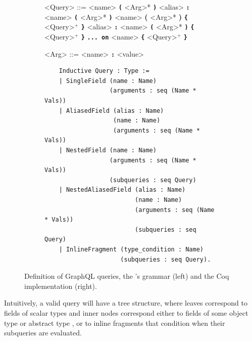 \begin{figure}[h]
  \centering
  \begin{subfigure}{.5\textwidth}
    \begin{grammar}
        <Query> ::= <name> \textbf{\texttt{(}} <Arg>* \textbf{\texttt{)}}
        \alt <alias> \textbf{\texttt{:}} <name> \textbf{\texttt{(}} <Arg>* \textbf{\texttt{)}}
        \alt <name> \textbf{(} <Arg>* \textbf{)} \textbf{\texttt{\{}} <Query>$^{+}$ \textbf{\texttt{\}}}
        \alt <alias> \textbf{\texttt{:}} <name> \textbf{\texttt{(}} <Arg>* \textbf{\texttt{)}} \textbf{\texttt{\{}} <Query>$^{+}$ \textbf{\texttt{\}}}
        \alt \textbf{\texttt{... on}} <name> \textbf{\texttt{\{}} <Query>$^{+}$ \textbf{\texttt{\}}}
        
        <Arg> ::= <name> \textbf{\texttt{:}} <value>
    \end{grammar}
  \end{subfigure}%
  \begin{subfigure}{.5\textwidth}

    \begin{verbatim}
    Inductive Query : Type :=
    | SingleField (name : Name)
                  (arguments : seq (Name * Vals))
    | AliasedField (alias : Name)
                   (name : Name)
                   (arguments : seq (Name * Vals))
    | NestedField (name : Name)
                  (arguments : seq (Name * Vals))
                  (subqueries : seq Query)
    | NestedAliasedField (alias : Name)
                         (name : Name)
                         (arguments : seq (Name * Vals))
                         (subqueries : seq Query)
    | InlineFragment (type_condition : Name)
                     (subqueries : seq Query).
    \end{verbatim}
  \end{subfigure}
  \caption{Definition of GraphQL queries, the \spec{}'s grammar (left) and the Coq implementation (right).}
  \label{fig:query_def}
\end{figure}

Intuitively, a valid query will have a tree structure, where leaves correspond to fields of scalar types and inner nodes correspond either to fields of some object type or abstract type , or to inline fragments that condition when their subqueries are evaluated. 


